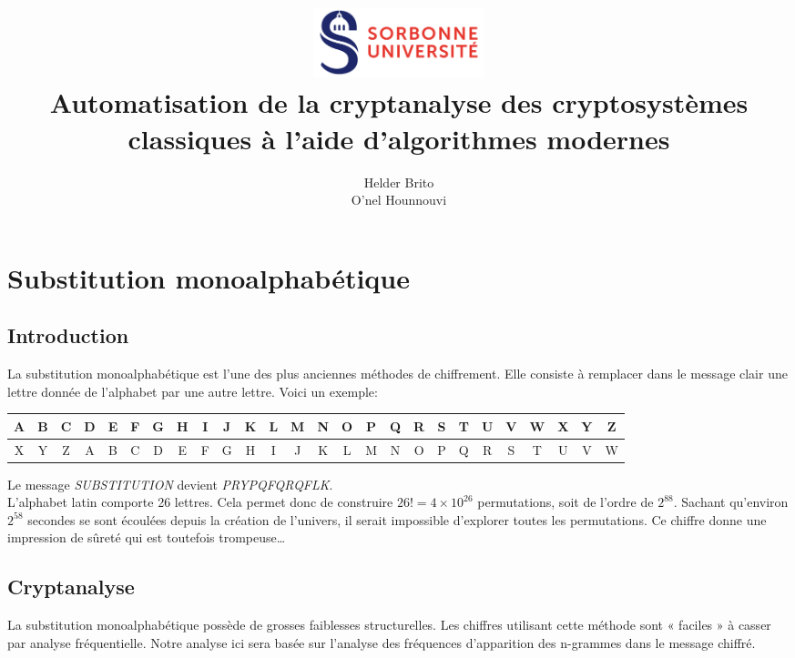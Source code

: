 \documentclass[a4paper]{article}
\title{
    \includegraphics[width=5cm]{logo_su.jpg} \\[1em]
    \Huge Automatisation de la cryptanalyse des cryptosystèmes classiques à l’aide d’algorithmes modernes
}
\author{Helder Brito\\O'nel Hounnouvi}
\date{}
\begin{document}
\maketitle 
\clearpage 
\tableofcontents
\clearpage 

\section{Substitution monoalphabétique}

\subsection{Introduction}

La substitution monoalphabétique est l'une des plus anciennes méthodes de chiffrement. Elle consiste à remplacer dans le message clair une lettre donnée de l'alphabet par une autre lettre. Voici un exemple:

\vspace{1em}
\begin{adjustbox}{width=\textwidth,center}
    \begin{tabular}{|c|c|c|c|c|c|c|c|c|c|c|c|c|c|c|c|c|c|c|c|c|c|c|c|c|c|}
        \hline
        A & B & C & D & E & F & G & H & I & J & K & L & M & N & O & P & Q & R & S & T & U & V & W & X & Y & Z \\
        \hline
        X & Y & Z & A & B & C & D & E & F & G & H & I & J & K & L & M & N & O & P & Q & R & S & T & U & V & W \\
        \hline
    \end{tabular}
\end{adjustbox}
\vspace{1em}

Le message \textit{SUBSTITUTION} devient \textit{PRYPQFQRQFLK}.\\

L'alphabet latin comporte 26 lettres. Cela permet donc de construire $26! = 4 \times 10^{26}$ permutations, soit de l'ordre de $2^{88}$.  
Sachant qu’environ $2^{58}$ secondes se sont écoulées depuis la création de l’univers, il serait impossible d’explorer toutes les permutations.  
Ce chiffre donne une impression de sûreté qui est toutefois trompeuse\ldots

\subsection{Cryptanalyse}

La substitution monoalphabétique possède de grosses faiblesses structurelles. Les chiffres utilisant cette méthode sont « faciles » à casser par analyse fréquentielle.  
Notre analyse ici sera basée sur l’analyse des fréquences d’apparition des n-grammes dans le message chiffré.
\end{document}
